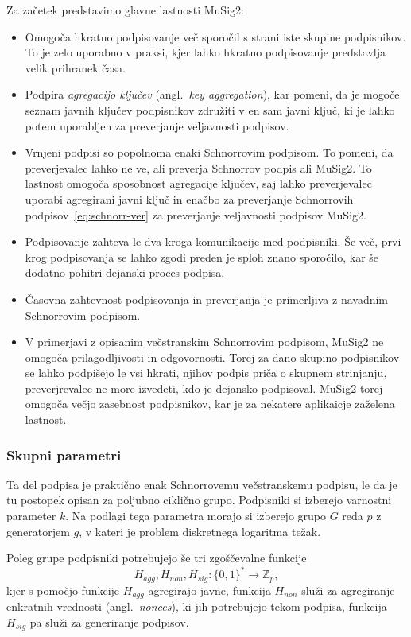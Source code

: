 \documentclass[isrm2, tisk]{fmfdelo}
\newcommand{\Z}{\mathbb Z}
\begin{document}
Za začetek predstavimo glavne lastnosti MuSig2:
\begin{itemize}
    \item Omogoča hkratno podpisovanje več sporočil s strani iste skupine podpisnikov. To je zelo
        uporabno v praksi, kjer lahko hkratno podpisovanje predstavlja velik prihranek časa.
    \item Podpira \textit{agregacijo ključev} (angl.\ \textit{key aggregation}), kar pomeni, da je
        mogoče seznam javnih ključev podpisnikov združiti v en sam javni ključ, ki je lahko potem
        uporabljen za preverjanje veljavnosti podpisov.
    \item Vrnjeni podpisi so popolnoma enaki Schnorrovim podpisom. To pomeni, da preverjevalec lahko
        ne ve, ali preverja Schnorrov podpis ali MuSig2. To lastnost omogoča sposobnost agregacije
        ključev, saj lahko preverjevalec uporabi agregirani javni ključ in enačbo za preverjanje
        Schnorrovih podpisov~\eqref{eq:schnorr-ver} za preverjanje veljavnosti podpisov MuSig2.
    \item Podpisovanje zahteva le dva kroga komunikacije med podpisniki. Še več, prvi krog podpisovanja
        se lahko zgodi preden je sploh znano sporočilo, kar še dodatno pohitri dejanski proces podpisa.
    \item Časovna zahtevnost podpisovanja in preverjanja je primerljiva z navadnim Schnorrovim
        podpisom.
    \item V primerjavi z opisanim večstranskim Schnorrovim podpisom, MuSig2 ne omogoča prilagodljivosti
        in odgovornosti. Torej za dano skupino podpisnikov se lahko podpišejo le vsi hkrati, njihov
        podpis priča o skupnem strinjanju, preverjrevalec ne more izvedeti, kdo je dejansko podpisoval.
        MuSig2 torej omogoča večjo zasebnost podpisnikov, kar je za nekatere aplikaicje zaželena lastnost.
\end{itemize}

\subsubsection{Skupni parametri}
Ta del podpisa je praktično enak Schnorrovemu večstranskemu podpisu, le da je tu postopek opisan za
poljubno ciklično grupo. Podpisniki si izberejo varnostni parameter $k$. Na podlagi tega parametra
morajo si izberejo grupo $G$ reda $p$ z generatorjem $g$, v kateri je problem diskretnega logaritma
težak.

Poleg grupe podpisniki potrebujejo še tri zgoščevalne funkcije
$$
H_{agg}, H_{non}, H_{sig}:\{0, 1\}^* \rightarrow \Z_p,
$$
kjer s pomočjo funkcije $H_{agg}$ agregirajo javne, funkcija $H_{non}$ služi za agregiranje enkratnih
vrednosti (angl.\ \textit{nonces}), ki jih potrebujejo tekom podpisa, funkcija $H_{sig}$ pa služi
za generiranje podpisov.
\end{document}
